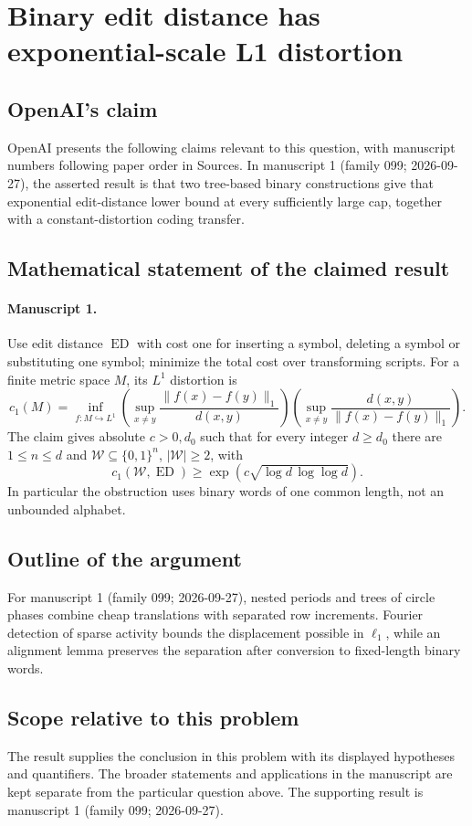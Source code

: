 \documentclass[11pt]{article}
\begin{document}
\section*{Binary edit distance has exponential-scale L1 distortion}

\subsection{OpenAI's claim}
OpenAI presents the following claims relevant to this question, with manuscript numbers following paper order in Sources. In manuscript 1 (family 099; 2026-09-27), the asserted result is that two tree-based binary constructions give that exponential edit-distance lower bound at every sufficiently large cap, together with a constant-distortion coding transfer.

\subsection{Mathematical statement of the claimed result}
\paragraph{Manuscript 1.}
Use edit distance $\operatorname{ED}$ with cost one for inserting a symbol, deleting a symbol or substituting one symbol; minimize the total cost over transforming scripts. For a finite metric space $M$, its $L^1$ distortion is
\[
 c_1(M)=\inf_{f:M\hookrightarrow L^1}
 \left(\sup_{x\ne y}\frac{\|f(x)-f(y)\|_1}{d(x,y)}\right)
 \left(\sup_{x\ne y}\frac{d(x,y)}{\|f(x)-f(y)\|_1}\right).
\]
The claim gives absolute $c>0,d_0$ such that for every integer $d\ge d_0$ there are $1\le n\le d$ and $\mathcal W\subseteq\{0,1\}^n$, $|\mathcal W|\ge2$, with
\[
 c_1(\mathcal W,\operatorname{ED})
 \ge\exp(c\sqrt{\log d\,\log\log d}).
\]
In particular the obstruction uses binary words of one common length, not an unbounded alphabet.

\subsection{Outline of the argument}
For manuscript 1 (family 099; 2026-09-27), nested periods and trees of circle phases combine cheap translations with separated row increments. Fourier detection of sparse activity bounds the displacement possible in $\ell_1$, while an alignment lemma preserves the separation after conversion to fixed-length binary words.

\subsection{Scope relative to this problem}
The result supplies the conclusion in this problem with its displayed hypotheses and quantifiers. The broader statements and applications in the manuscript are kept separate from the particular question above. The supporting result is manuscript 1 (family 099; 2026-09-27).
\end{document}
